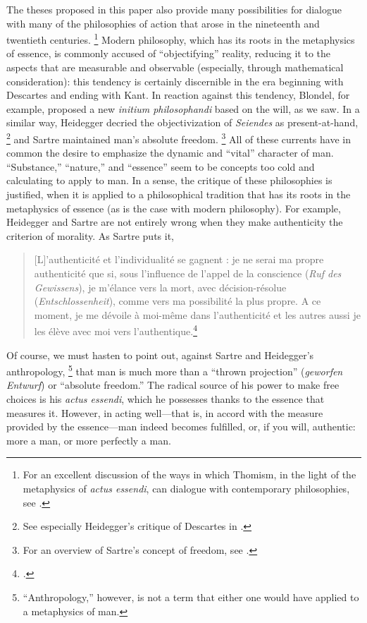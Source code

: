 The theses proposed in this paper also provide many possibilities for dialogue with many of the philosophies of action that arose in the nineteenth and twentieth centuries.%
\footnote{For an excellent discussion of the ways in which Thomism, in the light of the metaphysics of \emph{actus essendi}, can dialogue with contemporary philosophies, see \cite{clarke:thomism}.}
%
Modern philosophy, which has its roots in the metaphysics of essence, is commonly accused of ``objectifying'' reality, reducing it to the aspects that are measurable and observable (especially, through mathematical consideration): this tendency is certainly discernible in the era beginning with Descartes and ending with Kant. In reaction against this tendency, Blondel, for example, proposed a new \emph{initium philosophandi} based on the will, as we saw. In a similar way, Heidegger decried the objectivization of \emph{Seiendes} as present-at-hand,%
%
\footnote{See especially Heidegger's critique of Descartes in \cite[89--101 (122--134 in the English translation)]{heidegger:being}.}
%
and Sartre maintained man's absolute freedom.%
%
\footnote{For an overview of Sartre's concept of freedom, see \cite[35--37]{lucas:orizzonte}.}
%
All of these currents have in common the desire to emphasize the dynamic and ``vital'' character of man. ``Substance,'' ``nature,'' and ``essence'' seem to be concepts too cold and calculating to apply to man. In a sense, the critique of these philosophies is justified, when it is applied to a philosophical tradition that has its roots in the metaphysics of essence (as is the case with modern philosophy).
%
For example, Heidegger and Sartre are not entirely wrong when they make  authenticity the criterion of morality. As Sartre puts it,
%
\begin{quotation}
[L]'authenti­cité et l'individualité se gagnent : je ne serai ma propre authenticité que si, sous l'influence de l'appel de la conscience (\emph{Ruf des Gewissens}), je m'élance vers la mort, avec décision-résolue (\emph{Entschlossenheit}), comme vers ma possibilité la plus propre. A ce moment, je me dévoile à moi-même dans l'authenticité et les autres aussi je les élève avec moi vers l'authentique.\footcite[285]{sartre:etre-et-neant}
\end{quotation}
%
Of course, we must hasten to point out, against Sartre and Heidegger's anthropology,%
%
\footnote{``Anthropology,'' however, is not a term that either one would have applied to a metaphysics of man.}
%
that man is much more than a ``thrown projection'' (\emph{geworfen Entwurf}) or ``absolute freedom.'' The radical source of his power to make free choices is his \emph{actus essendi}, which he possesses thanks to the essence that measures it. However, in acting well---that is, in accord with the measure provided by the essence---man indeed becomes fulfilled, or, if you will, authentic: more a man, or more perfectly a man.
